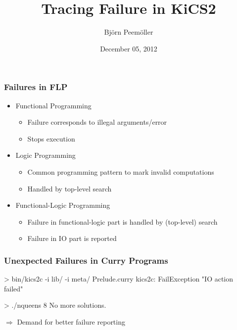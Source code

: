 \documentclass[
,hyperref={pdfpagelabels=false}
,xcolor=dvipsnames
]{beamer}
\title{Tracing Failure in KiCS2}
\date{December 05, 2012}
\author{Björn Peemöller}
\institute{Kiel University}
\newcommand{\ergo}{$\Rightarrow$}
\begin{document}
\begin{frame}[fragile]%
\titlepage
\end{frame}


\begin{frame}[fragile]%
\frametitle{Failures in FLP}

\begin{itemize}

\item Functional Programming
\begin{itemize}
\item Failure corresponds to illegal arguments/error
\item Stops execution
\end{itemize}

\item Logic Programming
\begin{itemize}
\item Common programming pattern to mark invalid computations
\item Handled by top-level search
\end{itemize}

\item Functional-Logic Programming
\begin{itemize}
\item Failure in functional-logic part is handled by (top-level) search
\item Failure in IO part is reported
\end{itemize}

\end{itemize}
\end{frame}


\begin{frame}[fragile]%
\frametitle{Unexpected Failures in Curry Programs}

\begin{example}
\begin{program}
> bin/kics2c -i lib/ -i meta/ Prelude.curry
kics2c: FailException "{}IO action failed"
\end{program}
\end{example}

\pause
\medskip

\begin{example}
\begin{program}
> ./nqueens 8
No more solutions.
\end{program}
\end{example}

\pause
\medskip

\begin{center}
\ergo{} Demand for better failure reporting
\end{center}
\end{frame}
\end{document}
